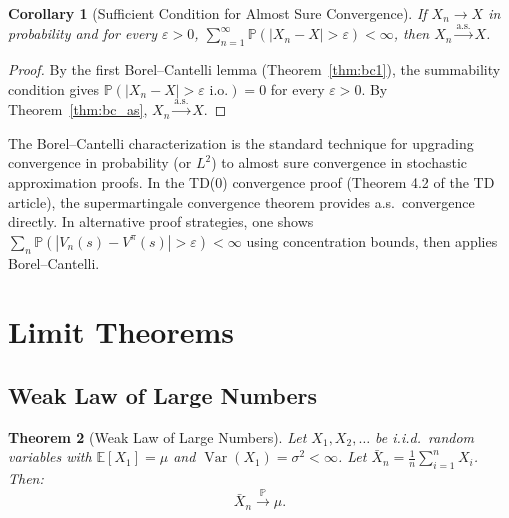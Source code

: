 \documentclass[11pt,a4paper]{article}
\theoremstyle{definition}
\theoremstyle{plain}
\newtheorem{theorem}{Theorem}[section]
\newtheorem{corollary}[theorem]{Corollary}
\theoremstyle{remark}
\DeclareMathOperator{\Var}{Var}
\newcommand{\E}{\mathbb{E}}
\newcommand{\Prob}{\mathbb{P}}
\newcommand{\cas}{\xrightarrow{\text{a.s.}}}
\newcommand{\cprob}{\xrightarrow{\Prob}}
\begin{document}
\begin{corollary}[Sufficient Condition for Almost Sure Convergence]
\label{cor:bc_sufficient}
If $X_n \to X$ in probability and for every $\varepsilon > 0$, $\sum_{n=1}^\infty \Prob(|X_n - X| > \varepsilon) < \infty$, then $X_n \cas X$.
\end{corollary}

\begin{proof}
By the first Borel--Cantelli lemma (Theorem~\ref{thm:bc1}), the summability condition gives $\Prob(|X_n - X| > \varepsilon \text{ i.o.}) = 0$ for every $\varepsilon > 0$. By Theorem~\ref{thm:bc_as}, $X_n \cas X$.
\end{proof}

\begin{rlconnection}[Connection to RL]
The Borel--Cantelli characterization is the standard technique for upgrading convergence in probability (or $L^2$) to almost sure convergence in stochastic approximation proofs. In the TD(0) convergence proof (Theorem 4.2 of the TD article), the supermartingale convergence theorem provides a.s.\ convergence directly. In alternative proof strategies, one shows $\sum_n \Prob(|V_n(s) - V^\pi(s)| > \varepsilon) < \infty$ using concentration bounds, then applies Borel--Cantelli.
\end{rlconnection}

\section{Limit Theorems}
\label{sec:limit_theorems}

\subsection{Weak Law of Large Numbers}
\label{subsec:wlln}

\begin{keyresult}
\begin{theorem}[Weak Law of Large Numbers]
\label{thm:wlln}
Let $X_1, X_2, \ldots$ be i.i.d.\ random variables with $\E[X_1] = \mu$ and $\Var(X_1) = \sigma^2 < \infty$. Let $\bar{X}_n = \frac{1}{n}\sum_{i=1}^n X_i$. Then:
\begin{equation}
    \bar{X}_n \cprob \mu.
    \label{eq:wlln}
\end{equation}
\end{theorem}
\end{keyresult}
\end{document}

